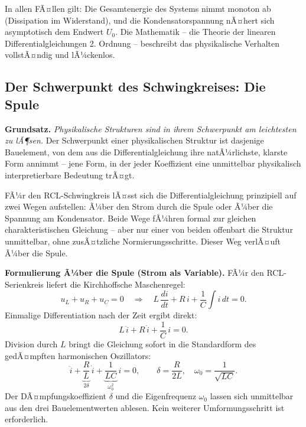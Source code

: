 ﻿\documentclass[12pt, a4paper]{article}
\begin{document}
	In allen FÃ¤llen gilt: Die Gesamtenergie des Systems nimmt monoton ab (Dissipation im Widerstand), und die Kondensatorspannung nÃ¤hert sich asymptotisch dem Endwert $U_0$. Die Mathematik -- die Theorie der linearen Differentialgleichungen 2. Ordnung -- beschreibt das physikalische Verhalten vollstÃ¤ndig und lÃ¼ckenlos.

	\subsection{Der Schwerpunkt des Schwingkreises: Die Spule}

	\textbf{Grundsatz.} \textit{Physikalische Strukturen sind in ihrem Schwerpunkt am leichtesten zu lÃ¶sen.} Der Schwerpunkt einer physikalischen Struktur ist dasjenige Bauelement, von dem aus die Differentialgleichung ihre natÃ¼rlichste, klarste Form annimmt -- jene Form, in der jeder Koeffizient eine unmittelbar physikalisch interpretierbare Bedeutung trÃ¤gt.

	FÃ¼r den RCL-Schwingkreis lÃ¤sst sich die Differentialgleichung prinzipiell auf zwei Wegen aufstellen: Ã¼ber den Strom durch die Spule oder Ã¼ber die Spannung am Kondensator. Beide Wege fÃ¼hren formal zur gleichen charakteristischen Gleichung -- aber nur einer von beiden offenbart die Struktur unmittelbar, ohne zusÃ¤tzliche Normierungsschritte. Dieser Weg verlÃ¤uft Ã¼ber die Spule.

	\textbf{Formulierung Ã¼ber die Spule (Strom als Variable).}
	FÃ¼r den RCL-Serienkreis liefert die Kirchhoffsche Maschenregel:
	\begin{equation}
		u_L + u_R + u_C = 0
		\quad \Longrightarrow \quad
		L\,\frac{di}{dt} + R\,i + \frac{1}{C}\int i\,dt = 0.
	\end{equation}
	Einmalige Differentiation nach der Zeit ergibt direkt:
	\begin{equation}
		L\,\ddot{i} + R\,\dot{i} + \frac{1}{C}\,i = 0.
		\label{eq:rlc_spule}
	\end{equation}
	Division durch $L$ bringt die Gleichung sofort in die Standardform des gedÃ¤mpften harmonischen Oszillators:
	\begin{equation}
		\ddot{i} + \underbrace{\frac{R}{L}}_{2\delta}\,\dot{i} + \underbrace{\frac{1}{LC}}_{\omega_0^2}\,i = 0,
		\qquad \delta = \frac{R}{2L},\quad \omega_0 = \frac{1}{\sqrt{LC}}.
		\label{eq:rlc_standardform}
	\end{equation}
	Der DÃ¤mpfungskoeffizient $\delta$ und die Eigenfrequenz $\omega_0$ lassen sich unmittelbar aus den drei Bauelementwerten ablesen. Kein weiterer Umformungsschritt ist erforderlich.
\end{document}
